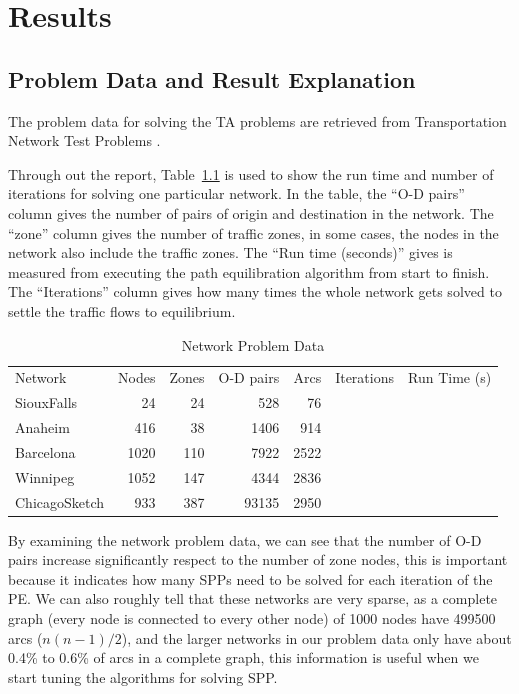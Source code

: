 \chapter{Results}

\section{Problem Data and Result Explanation}

The problem data for solving the TA problems are retrieved from Transportation Network Test Problems \citep{ProblemData}.

Through out the report, Table~\ref{table:problemdata} is used to show the run time and number of iterations for solving one particular network.
In the table, the ``O-D pairs'' column gives the number of pairs of origin and destination in the network.
The ``zone'' column gives the number of traffic zones,
in some cases, the nodes in the network also include the traffic zones.
The ``Run time (seconds)'' gives is measured from executing the 
path equilibration algorithm from start to finish.
The ``Iterations'' column gives how many times the whole network
gets solved to settle the traffic flows to equilibrium.
\begin{table}[H]
    \centering
    \begin{tabular}{lrrrrrr}
        Network & Nodes & Zones & O-D pairs & Arcs & Iterations & Run Time (s) \\
        SiouxFalls    & 24   & 24  & 528   & 76   \\
        Anaheim       & 416  & 38  & 1406  & 914  \\
        Barcelona     & 1020 & 110 & 7922  & 2522 \\
        Winnipeg      & 1052 & 147 & 4344  & 2836 \\
        ChicagoSketch & 933  & 387 & 93135 & 2950 
    \end{tabular}
    \caption{Network Problem Data}
    \label{table:problemdata}
\end{table}
By examining the network problem data,
we can see that the number of O-D pairs increase
significantly respect to the number of zone nodes,
this is important because it indicates how many SPPs need to be solved for each iteration of the PE.
We can also roughly tell that these networks are very sparse,
as a complete graph (every node is connected to every other node) of 1000 nodes have 499500 arcs ($n(n-1)/2$),
and the larger networks in our problem data only have about 0.4\% to 0.6\% of arcs in a complete graph, this information is useful
when we start tuning the algorithms for solving SPP.

